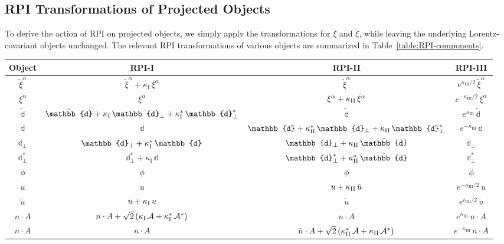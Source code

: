 \documentclass[12pt,document,nofootinbib,superscriptaddress,onecolumn,preprintnumbers,balancelastpage]{article}
\newcommand{\rpii}{{\kappa_\text{I}}}
\newcommand{\rpiiii}{{\kappa_\text{III}}}
\newcommand{\PP}{\mathbb{d}}
\DeclareRobustCommand{\Tab}[1]{Table~\ref{#1}}
\newcommand{\alc}{\mathcal{A}}
\begin{document}
\begin{spacing}{1.2}
\subsection{RPI Transformations of Projected Objects}
%
To derive the action of RPI on projected objects, we simply apply the transformations for $\xi$ and $\tilde{\xi}$, while leaving the underlying Lorentz-covariant objects unchanged.
%
The relevant RPI transformations of various objects are summarized in \Tab{table:RPI-components}.

\begin{table}[t!]
\renewcommand{\arraystretch}{1.7}
\setlength{\arrayrulewidth}{.3mm}
\centering
\setlength{\tabcolsep}{0.95 em}
\begin{tabular}{ |c || c | c | c|}
\hline
 Object &  RPI-I &  RPI-II & RPI-III   \\ \hline \hline
 $\tilde{\xi}^\alpha $  & $\tilde{\xi}^\alpha + \rpii \,\xi^\alpha$   & $\tilde{\xi}^\alpha $ &  $ e^{\rpiiii/2}\, \tilde{\xi}^\alpha $ \\
$\xi^\alpha  $ &     $\xi^\alpha$    & $\xi^\alpha+ \kappa_{\rm II} \, \tilde{\xi}^\alpha$ &  $ e^{-\rpiiii/2}\, \xi^\alpha$  \\
\hline
  $\tilde{\PP} $ &  $ \tilde{\PP} +\rpii\, \PP_\perp+\kappa_{\rm I}^*\, \PP^*_\perp$  & $\tilde{\PP}$ & $ e^\rpiiii \,\tilde{\PP}$ \\
  $\PP  $ &  $\PP$   & $\PP + \kappa_{\rm II}^* \, \PP_\perp + \kappa_{\rm II} \, \PP_\perp^*$  &$e^{-\rpiiii}\,\PP$ \\
 $\PP_\perp $ &   $ \PP_\perp + \kappa_{\rm I}^*\, \PP$   &$\PP_\perp + \kappa_{\rm II} \, \tilde{\PP} $& $ \PP_\perp $ \\
  $\PP_\perp^* $ &  $\PP_\perp^* + \rpii\, \PP$  & $\PP_\perp^* + \kappa_{\rm II}^*  \, \tilde{\PP}$& $ \PP_\perp^* $ \\
\hline
$\phi  $ &    $\phi$   &  $\phi$ &  $ \phi$  \\
  $ u $ &   $u$ & $u + \kappa_{\rm II} \, \tilde{u}$ & $  e^{-\rpiiii/2}\,u $ \\
  $ \tilde{u} $ &     $ \tilde{u} + \kappa_{\rm I} \, u$ & $\tilde{u}$ & $  e^{\rpiiii/2}\, \tilde{u} $ \\
  \hline
  ${n} \cdot A $ &  $ {n} \cdot A +\sqrt{2} \left(\rpii\, \alc +\kappa_{\rm I}^*\, \alc^*\right)$  & ${n} \cdot A$ & $ e^\rpiiii \,{n} \cdot A$ \\
  $\bar{n} \cdot A   $ &  $\bar{n} \cdot A$   & $\bar{n} \cdot A + \sqrt{2} \left(\kappa_{\rm II}^* \, \alc + \kappa_{\rm II} \, \alc^* \right)$  &$e^{-\rpiiii}\,\bar{n} \cdot A $ \\

\end{tabular}
\end{table}
\end{spacing}
\end{document}
